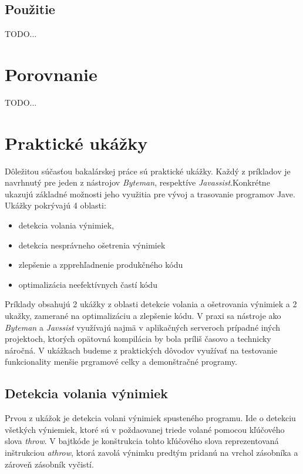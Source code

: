 \documentclass[11pt,final,oneside]{fithesis}
\begin{document}
\section{Použitie}
TODO...

\chapter{Porovnanie}
TODO...

\chapter{Praktické ukážky}
Dôležitou súčasťou bakalárskej práce sú praktické ukážky. Každý z príkladov je navrhnutý pre jeden z nástrojov \textit{Byteman}, respektíve \textit{Javassist}.Konkrétne ukazujú základné možnosti jeho využitia pre vývoj a trasovanie programov Jave. Ukážky pokrývajú 4 oblasti:

\begin{itemize}
\item detekcia volania výnimiek, 
\item detekcia nesprávneho ošetrenia výnimiek
\item zlepšenie a zpprehľadnenie produkčného kódu
\item optimalizácia neefektívnych častí kódu
\end{itemize}

Príklady obsahujú 2 ukážky z oblasti detekcie volania a ošetrovania výnimiek a 2 ukažky, zamerané na optimalizáciu a zlepšenie kódu. V praxi sa nástroje ako
\textit{Byteman} a \textit{Javssist} využívajú najmä v aplikačných serveroch  prípadné iných projektoch, ktorých opätovná kompilácia by bola príliš časovo a technicky náročná. V ukážkach budeme z praktických dôvodov využívať na testovanie funkcionality menšie prgramové celky a demonštračné programy.

\section{Detekcia volania výnimiek}

Prvou z ukážok je detekcia volani výnimiek spusteného programu. Ide o detekciu všetkých výniemiek, ktoré sú v poždaovanej triede volané pomocou kľúčového slova \textit{throw}. V bajtkóde je konštrukcia tohto kľúčového slova reprezentovaná inštrukciou \textit{athrow}, ktorá zavolá výnimku predtým pridanú na vrchol zásobníka a zároveň zásobník vyčistí.
\end{document}
